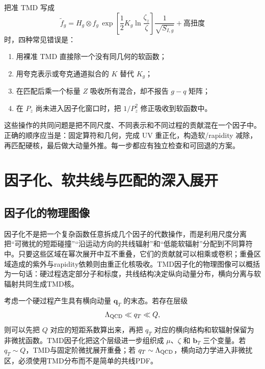 \documentclass[UTF8,12pt,a4paper,twoside,openany]{ctexbook}
\newcommand{\bT}{\boldsymbol b_T}
\begin{document}
把准 TMD 写成
\begin{equation}
  \widetilde f_g
  =H_g\otimes f_g\,
  \exp\left[\frac{1}{2}K_g\ln\frac{\zeta_z}{\zeta}\right]
  \frac{1}{\sqrt{S_{I,g}}}
  +\text{高扭度}
  \label{eq:matchingrepeat}
\end{equation}
时，四种常见错误是：
\begin{enumerate}
  \item 用裸准 TMD 直接除一个没有同几何的软函数；
  \item 用夸克表示或夸克通道拟合的 \(K\) 替代 \(K_g\)；
  \item 在匹配后乘一个标量 \(Z\) 吸收所有混合，却不报告 \(g-q\) 矩阵；
  \item 在 \(P_z\) 尚未进入因子化窗口时，把 \(1/P_z^2\) 修正吸收到软函数中。
\end{enumerate}
这些操作的共同问题是把不同尺度、不同表示和不同过程的贡献混在一个因子中。正确的顺序应当是：固定算符和几何，完成 UV 重正化，构造软/rapidity 减除，再匹配硬核，最后做大动量外推。每一步都应有独立检查和可回退的方案。

\clearpage
\chapter{因子化、软共线与匹配的深入展开}
\label{sec:factorization-details}

\section{因子化的物理图像}

因子化不是把一个复杂函数任意拆成几个因子的代数操作，而是利用尺度分离把“可微扰的短距碰撞”“沿运动方向的共线辐射”和“低能软辐射”分配到不同算符中。只要这些区域在幂次展开中互不重叠，它们的贡献就可以相乘或卷积；重叠区域造成的紫外与rapidity依赖则由重正化核吸收。TMD因子化的物理图像可以概括为一句话：硬过程选定部分子和标度，共线结构决定纵向动量分布，横向分离与软辐射共同生成TMD核。

考虑一个硬过程产生具有横向动量 \(\mathbf q_T\) 的末态。若存在层级
\begin{equation}
  \Lambda_{\rm QCD}\ll q_T\ll Q,
  \label{eq:fact-hierarchy}
\end{equation}
则可以先把 \(Q\) 对应的短距系数算出来，再把 \(q_T\) 对应的横向结构和软辐射保留为非微扰函数。TMD因子化把这个层级进一步组织成 \(\mu\)、\(\zeta\) 和 \(\bT\) 三个变量。若 \(q_T\sim Q\)，TMD与固定阶微扰展开重叠；若 \(q_T\sim\Lambda_{\rm QCD}\)，横向动力学进入非微扰区，必须使用TMD分布而不是简单的共线PDF。
\end{document}
